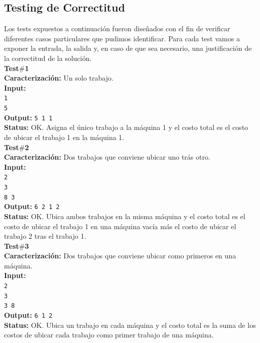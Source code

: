 \subsection{Testing de Correctitud}

Los tests expuestos a continuación fueron diseñados con el fin de verificar
diferentes casos particulares que pudimos identificar. Para cada test vamos
a exponer la entrada, la salida y, en caso de que sea necesario, una
justificaci\'on de la correctitud de la soluci\'on.\\

\noindent\textbf{Test$\#$1}\\
\textbf{Caracterización:} Un solo trabajo.\\
\textbf{Input:}\\ \texttt{1\\5}\\
\textbf{Output:} \texttt{5 1 1}\\
\textbf{Status:} OK. Asigna el único trabajo a la máquina 1 y el costo total
es el costo de ubicar el trabajo 1 en la máquina 1.\\

\noindent\textbf{Test$\#$2}\\
\textbf{Caracterización:} Dos trabajos que conviene ubicar uno trás otro.\\
\textbf{Input:}\\ \texttt{2\\3\\8 3}\\
\textbf{Output:} \texttt{6 2 1 2}\\
\textbf{Status:} OK. Ubica ambos trabajos en la misma máquina y el costo
total es el costo de ubicar el trabajo 1 en una máquina vacía más el costo
de ubicar el trabajo 2 tras el trabajo 1.\\

\noindent\textbf{Test$\#$3}\\
\textbf{Caracterización:} Dos trabajos que conviene ubicar como primeros en
una máquina.\\
\textbf{Input:}\\ \texttt{2\\3\\3 8}\\
\textbf{Output:} \texttt{6 1 2}\\
\textbf{Status:} OK. Ubica un trabajo en cada máquina y el costo total es la
suma de los costos de ubicar cada trabajo como primer trabajo de una máquina.\\

